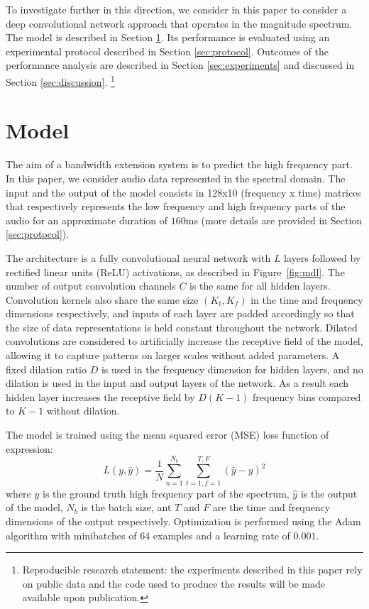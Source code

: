 \documentclass{article}
\begin{document}
To investigate further in this direction, we consider in this paper to consider a deep convolutional network approach that operates in the magnitude spectrum. The model is described in Section \ref{sec:model}. Its performance is evaluated using an experimental protocol described in Section \ref{sec:protocol}. Outcomes of the performance analysis are described in Section \ref{sec:experiments} and discussed in Section \ref{sec:discussion}. \footnote{Reproducible research statement: the experiments described in this paper rely on public data and the code used to produce the results will be made available upon publication.}

\section{Model}
\label{sec:model}

The aim of a bandwidth extension system is to predict the high frequency part. In this paper, we consider audio data represented in the spectral domain. The input and the output of the model consists in 128x10 (frequency x time) matrices that respectively represents the low frequency and high frequency parts of the audio for an approximate duration of $160$ms (more details are provided in Section \ref{sec:protocol}).

The architecture is a fully convolutional neural network \cite{long2015fully} with $L$ layers followed by rectified linear units (ReLU) activations, as described in Figure~\ref{fig:mdl}. The number of output convolution channels $C$ is the same for all hidden layers. Convolution kernels also share the same size $(K_t, K_f)$ in the time and frequency dimensions respectively, and inputs of each layer are padded accordingly so that the size of data representations is held constant throughout the network. Dilated convolutions \cite{yu2016multi, oord2016wavenet} are considered to artificially increase the receptive field of the model, allowing it to capture patterns on larger scales without added parameters. A fixed dilation ratio $D$ is used in the frequency dimension for hidden layers, and no dilation is used in the input and output layers of the network. As a result each hidden layer increases the receptive field by $D(K-1)$ frequency bins compared to $K-1$ without dilation.

The model is trained using the mean squared error (MSE) loss function of expression:
\begin{equation}
L(y, \hat y) = \frac{1}{N}\sum\limits_{n=1}^{N_b}\sum\limits_{t=1, f=1}^{T, F}(\hat y - y)^2
\end{equation}
where $y$ is the ground truth high frequency part of the spectrum, $\hat y$ is the output of the model, $N_b$ is the batch size, ant $T$ and $F$ are the time and frequency dimensions of the output respectively. Optimization is performed using the Adam \cite{kingma2014adam} algorithm with minibatches of $64$ examples and a learning rate of $0.001$.
\end{document}
